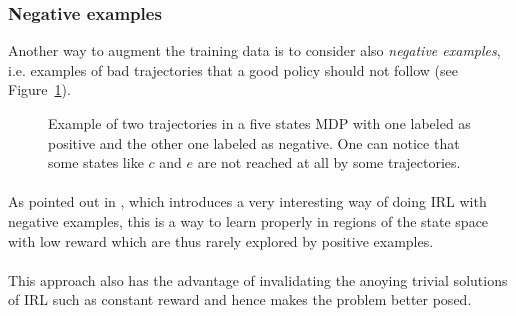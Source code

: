 \documentclass{article}
\begin{document}
\subsubsection{Negative examples}
Another way to augment the training data is to consider also \emph{negative examples}, i.e. examples of bad trajectories that a good policy should not follow (see Figure~\ref{fig:negpos}).


\begin{figure}
\begin{center}
\end{center}
\caption{Example of two trajectories in a five states MDP with one labeled as positive and the other one labeled as negative. One can notice that some states like $c$ and $e$ are not reached at all by some trajectories. \label{fig:negpos}}
\end{figure}


\paragraph{}
As pointed out in \cite{Lee16}, which introduces a very interesting way of doing IRL with negative examples, this is a way to learn properly in regions of the state space with low reward which are thus rarely explored by positive examples.

\paragraph{}
This approach also has the advantage of invalidating the anoying trivial solutions of IRL such as constant reward and hence makes the problem better posed.
\end{document}
